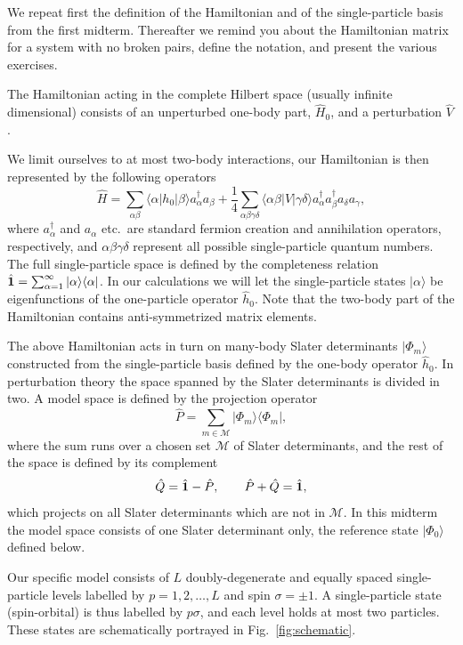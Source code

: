 \documentclass[prc]{revtex4}
\begin{document}
We repeat first the definition of the Hamiltonian and of the
single-particle basis from the first midterm. Thereafter we remind you
about the Hamiltonian matrix for a system with no broken pairs, define
the notation, and present the various exercises.


The Hamiltonian acting in the complete Hilbert space (usually infinite
dimensional) consists of an unperturbed one-body part, $\hat{H}_0$,
and a perturbation $\hat{V}$.

We limit ourselves to at most two-body interactions, our Hamiltonian
is then represented by the following operators
\[
\hat{H} = \sum_{\alpha\beta}\langle \alpha |h_0|\beta\rangle
a_{\alpha}^{\dagger}a_{\beta}
+\frac{1}{4}\sum_{\alpha\beta\gamma\delta}\langle \alpha\beta|
V|\gamma\delta\rangle
a_{\alpha}^{\dagger}a_{\beta}^{\dagger}a_{\delta}a_{\gamma},
\]
where $a_{\alpha}^{\dagger}$ and $a_{\alpha}$ etc.~are standard
fermion creation and annihilation operators, respectively, and
$\alpha\beta\gamma\delta$ represent all possible single-particle
quantum numbers.  The full single-particle space is defined by the
completeness relation $\hat{{\bf 1}} = \sum_{\alpha
  =1}^{\infty}|\alpha \rangle \langle \alpha|$.  In our calculations
we will let the single-particle states $|\alpha\rangle$ be
eigenfunctions of the one-particle operator $\hat{h}_0$. Note that the two-body part of the Hamiltonian
contains anti-symmetrized matrix elements.


The above Hamiltonian acts in turn on many-body Slater determinants
$|\Phi_m\rangle$ constructed from the single-particle basis defined by
the one-body operator $\hat{h}_0$. In perturbation theory the space
spanned by the Slater determinants is divided in two. A model space
is defined by the projection operator
\[
\hat{P} = \sum_{m\in\mathcal{M}}|\Phi_m\rangle\langle\Phi_m|,
\]
where the sum runs over a chosen set $\mathcal{M}$ of Slater
determinants, and the rest of the space is defined by its complement
\[
\hat{Q}=\hat{{\bf 1}}-\hat{P},\qquad \hat{P}+\hat{Q}=\hat{{\bf 1}} ,
\]
which projects on all Slater determinants which are not in
$\mathcal{M}$. In this midterm the model space consists of one Slater
determinant only, the reference state $|\Phi_0\rangle$ defined below.


Our specific model consists of $L$ doubly-degenerate and equally
spaced single-particle levels labelled by $p=1,2,\dots,L$ and spin
$\sigma=\pm 1$. A single-particle state (spin-orbital) is thus labelled
by $p\sigma$, and each level holds at most two particles.  These states
are schematically portrayed in Fig.~\ref{fig:schematic}.
\end{document}
